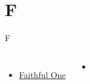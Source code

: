 \documentclass{beamer}
\begin{document}
\section{F}

\begin{frame}[t]{F}
\begin{columns}[t]
        \begin{itemize}
    \item \hyperlink{Faithful One[]}{Faithful One } \phantom{ 1 1 1 1 1 1 1 1 1 1 1}
\end{itemize}
        \begin{itemize}
            \item[] \phantom{1}\end{itemize}


\end{columns}

\end{frame}
\end{document}
